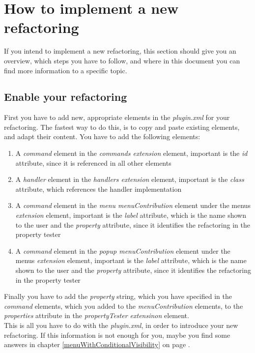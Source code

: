 \documentclass[a4paper,10pt]{report}
\begin{document}
\section{How to implement a new refactoring}
If you intend to implement a new refactoring, this section should give you an overview, which steps you have to follow,
and where in this document you can find more information to a specific topic.

\subsection{Enable your refactoring}
First you have to add new, appropriate elements in the {\it plugin.xml} for your refactoring.
The fastest way to do this, is to copy and paste existing elements, and adapt their content. You have to add the following elements:
   \begin{enumerate}
    \item A {\it command} element in the {\it commands extension} element, important is the {\it id} attribute, since it is referenced in all other elements
    \item A {\it handler} element in the {\it handlers extension} element, important is the {\it class} attribute, which references the handler implementation
    \item A {\it command} element in the {\it menu menuContribution} element under the menus {\it extension} element, important is the {\it label} attribute, which is the name shown to the user and the {\it property} attribute, since it identifies the refactoring in the property tester
    \item A {\it command} element in the {\it popup menuContribution} element under the menus {\it extension} element, important is the {\it label} attribute, which is the name shown to the user and the {\it property} attribute, since it identifies the refactoring in the property tester
   \end{enumerate}
Finally you have to add the {\it property} string, which you have specified in the {\it command} elements,
which you added to the {\it menuContribution} elements, to the {\it properties} attribute in the {\it propertyTester extensinon} element.\\
This is all you have to do with the {\it plugin.xml}, in order to introduce your new refactoring.
If this information is not enough for you, maybe you find some answers in chapter \ref{menuWithConditionalVisibility} on page \pageref{menuWithConditionalVisibility}.
\end{document}
